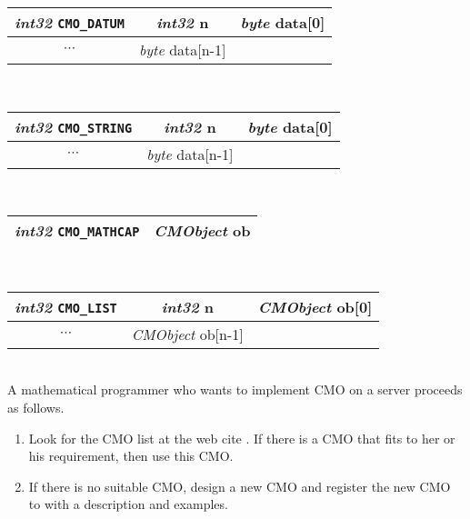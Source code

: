 \begin{tabular}{|c|c|c|}
\hline
{\sl int32} {\tt CMO\_DATUM}& {\sl int32} {\rm n} & {\sl byte} {\rm  data[0]} \\
\hline
$\cdots$ & {\sl byte} {\rm  data[n-1]} \\ 
\cline{1-2}
\end{tabular} \\
\begin{tabular}{|c|c|c|}
\hline
{\sl int32} {\tt CMO\_STRING}& {\sl int32} {\rm n} & {\sl byte} {\rm data[0]} \\
\hline
$\cdots$ & {\sl byte} {\rm data[n-1]} \\ 
\cline{1-2}
\end{tabular} \\
\begin{tabular}{|c|c|}
\hline
{\sl int32} {\tt CMO\_MATHCAP} & {\sl CMObject} {\rm ob} \\ 
\hline
\end{tabular} \\
\begin{tabular}{|c|c|c|}
\hline
{\sl int32} {\tt CMO\_LIST}& {\sl int32} {\rm n} & {\sl CMObject} {\rm ob[0]} \\
\hline
$\cdots$ & {\sl CMObject} {\rm ob[n-1]} \\ 
\cline{1-2}
\end{tabular} \\

A mathematical programmer who wants to implement CMO on a server proceeds 
as follows.
\begin{enumerate}
\item Look for the CMO list at the web cite \cite{openxm-web}.
If there is a CMO that fits to her or his requirement, then use this CMO.     
\item If there is no suitable CMO, design a new CMO and register 
the new CMO to \cite{openxm-web} with a description and examples.
\end{enumerate}
